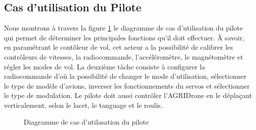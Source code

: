 		\subsection{Cas d'utilisation du Pilote}
		Nous montrons à travers la figure \ref{fig:D.P} le diagramme de cas d'utilisation du pilote qui permet de déterminer les principales fonctions qu'il doit effectuer. À savoir, en paramétrant le contôleur de vol, cet acteur a la possibilité de calibrer les contrôleurs de vitesses, la radiocommande, l'accéléromètre, le magnétomètre et régler les modes de vol. La deuxième tâche consiste à configurer la radiocommande d'où la possibilité de changer le mode d'utilisation, sélectionner le type de modèle d'avions, inverser les fonctionnements du servos et sélectionner le type de modulation. Le pilote doit aussi contrôler l'AGRIDrone en le déplaçant verticalement, selon le lacet, le tanguage et le roulis.
		\begin {figure}[H] 
		\begin{center} 
			\centering
			\hspace*{0.1cm}		
		\end{center}
		
		\caption{\label{fig:D.P}Diagramme de cas d'utilasation du pilote}
		\end {figure}
		
		
